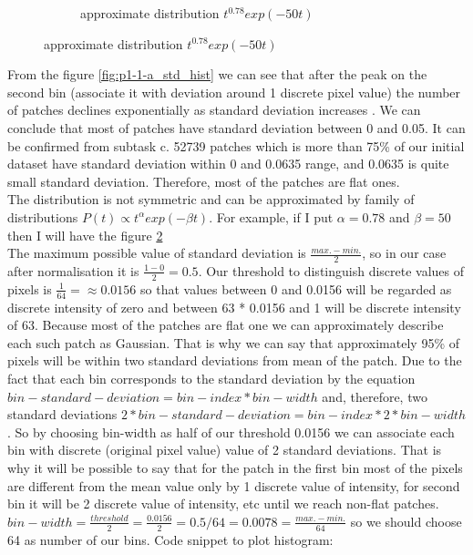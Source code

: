 \documentclass{article}
\begin{document}
\begin{enumerate}[label=(\alph*)]
\begin{figure}[htbp]
\begin{subfigure}{0.5\textwidth}
				 			\caption{approximate distribution $t^{0.78} exp(-50t)$}
				 			\label{fig:p1-1-a_dist}
				 		\end{subfigure}%
				 	\end{figure}
				 	From the figure \ref{fig:p1-1-a_std_hist} we can see that after the peak on the second bin (associate it with deviation around 1 discrete pixel value) the number of patches declines exponentially as  standard deviation increases . We can conclude that most of patches have standard deviation between 0 and 0.05. It can be confirmed from subtask c. 52739 patches which is more than 75\% of our initial dataset have standard deviation within 0 and 0.0635 range, and 0.0635 is quite small standard deviation. Therefore, most of the patches are flat ones. \\
				 	The distribution is not symmetric and can be approximated by family of distributions $P(t) \propto t^{\alpha} exp(-\beta t)$. For example, if I put $\alpha = 0.78$ and $\beta = 50$ then I will have the figure \ref{fig:p1-1-a_dist}\\
				 	The maximum possible value of standard deviation is $\frac{max. - min.}{2}$, so in our case after normalisation it is $\frac{1 - 0}{2}= 0.5$. Our threshold to distinguish discrete values of pixels is $\frac{1}{64} = \approx 0.0156$ so that values between 0 and 0.0156 will be regarded as discrete intensity of zero and between 63 * 0.0156 and 1 will be discrete intensity of 63. Because most of the patches are flat one we can approximately describe each such patch as Gaussian. That is why we can say that approximately 95\% of pixels will be within two standard deviations from mean of the patch. Due to the fact that each bin corresponds to the standard deviation by the equation $bin-standard-deviation = bin-index * bin-width$ and, therefore, two standard deviations $2 * bin-standard-deviation = bin-index * 2 * bin-width$. So by choosing bin-width as half of our threshold 0.0156 we can associate each bin with discrete (original pixel value) value of 2 standard deviations. That is why it will be possible to say that for the patch in the first bin most of the pixels are different from the mean value only by 1 discrete value of intensity, for second bin it will be 2 discrete value of intensity, etc until we reach non-flat patches. $bin-width = \frac{threshold} {2} = \frac{0.0156}{2} =0.5/64 = 0.0078 = \frac{max. - min.}{64}$   so we should choose 64 as number of our bins.
				 	Code snippet to plot histogram:
				 	
				 	

\end{enumerate}
\end{document}
